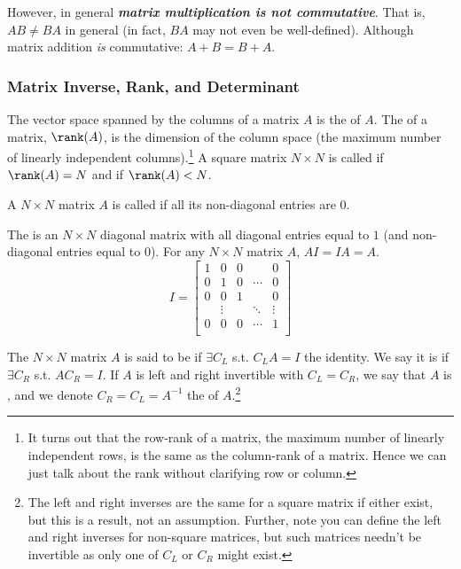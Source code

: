 \documentclass{article}
\begin{document}
However, in general \textbf{\textit{matrix multiplication is not commutative}}. That is, $AB \ne BA$ in general (in fact, $BA$ may not even be well-defined). Although matrix addition \textit{is} commutative: $A + B = B + A$.

\subsubsection{Matrix Inverse, Rank, and Determinant}
\label{ssub:matrix_inverse_rank_and_determinant}

\begin{definition}
  The vector space spanned by the columns of a matrix $A$ is the  of $A$. The  of a matrix, $\rank(A)$, is the dimension of the column space (the maximum number of linearly independent columns).\footnote{It turns out that the row-rank of a matrix, the maximum number of linearly independent rows, is the same as the column-rank of a matrix. Hence  we can just  talk about the rank without clarifying row or column.} A square matrix $N \times N$ is called  if $\rank(A) = N$ and  if $\rank(A) < N$.
\end{definition}

\begin{definition}
  A $N \times N$ matrix $A$ is called  if all its non-diagonal entries are $0$.
\end{definition}

\begin{definition}
  The  is an $N \times N$ diagonal matrix with all diagonal entries equal to $1$ (and non-diagonal entries equal to $0$). For any $N \times N$ matrix $A$, $AI = IA = A$.
  \[
    I = \left[\begin{matrix}
        1    & 0      & 0 &        & 0      \\
        0    & 1      & 0 & \cdots & 0      \\
        0    & 0      & 1 &        & 0      \\
             & \vdots &   & \ddots & \vdots \\
        0    & 0      & 0 & \cdots & 1      \\
    \end{matrix}\right]
  \]
\end{definition}

\begin{definition}
  The $N \times N$ matrix $A$ is said to be  if $\exists C_L$ s.t. $C_L A = I$ the identity. We say it is  if $\exists C_R$ s.t. $A C_R = I$. If $A$ is left and right invertible with $C_L = C_R$, we say that $A$ is , and we denote $C_R = C_L = A^{-1}$ the  of $A$.\footnote{The left and right inverses are the same for a square matrix if either exist, but this is a result, not an assumption. Further, note you can define the left and right inverses for non-square matrices, but such matrices needn't be invertible as only one of $C_L$ or $C_R$ might exist.}
\end{definition}
\end{document}

